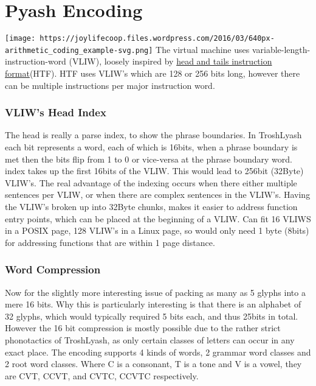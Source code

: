 \section{Pyash Encoding}\label{troshlyash-encoding-for-virtual-machine}

\texttt{[image: https://joylifecoop.files.wordpress.com/2016/03/640px-arithmetic\_coding\_example-svg.png]}
The virtual machine uses variable-length-instruction-word (VLIW),
loosely inspired by
\href{http://scale.eecs.berkeley.edu/papers/hat-cases2001.pdf}{head and
tails instruction format}(HTF). HTF uses VLIW's which are 128 or 256
bits long, however there can be multiple instructions per major
instruction word.

\subsubsection{VLIW's Head Index}\label{vliws-head-index}

The head is really a parse index, to show the phrase boundaries. In
TroshLyash each bit represents a word, each of which is 16bits, when a
phrase boundary is met then the bits flip from 1 to 0 or vice-versa at
the phrase boundary word. index takes up the first 16bits of the VLIW.
This would lead to 256bit (32Byte) VLIW's. The real advantage of the
indexing occurs when there either multiple sentences per VLIW, or when
there are complex sentences in the VLIW's. Having the VLIW's broken up
into 32Byte chunks, makes it easier to address function entry points,
which can be placed at the beginning of a VLIW. Can fit 16 VLIWS in a
POSIX page, 128 VLIW's in a Linux page, so would only need 1 byte
(8bits) for addressing functions that are within 1 page distance.

\subsubsection{Word Compression}\label{word-compression}

Now for the slightly more interesting issue of packing as many as 5
glyphs into a mere 16 bits. Why this is particularly interesting is that
there is an alphabet of 32 glyphs, which would typically required 5 bits
each, and thus 25bits in total. However the 16 bit compression is mostly
possible due to the rather strict phonotactics of TroshLyash, as only
certain classes of letters can occur in any exact place. The encoding
supports 4 kinds of words, 2 grammar word classes and 2 root word
classes. Where C is a consonant, T is a tone and V is a vowel, they are
CVT, CCVT, and CVTC, CCVTC respectively.

